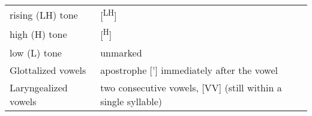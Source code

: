 \begin{tabular}{lp{4.5cm}} 


rising (LH) tone & [\textsuperscript{LH}] \\



high (H) tone & [\textsuperscript{H}] \\



low (L) tone & unmarked \\



Glottalized vowels & apostrophe [{'}] immediately after the vowel  \\



 Laryngealized vowels & two consecutive vowels, [VV] (still within a single syllable)  \\


\end{tabular}






